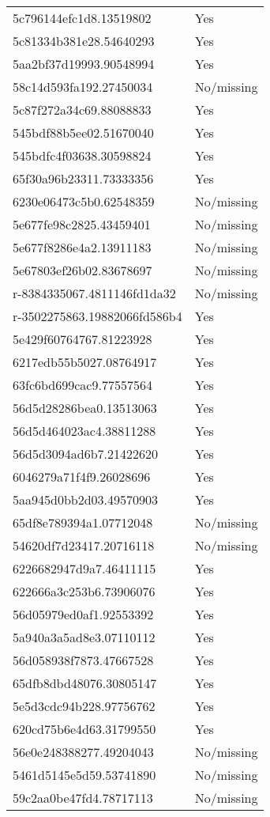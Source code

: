 \begin{tabular}{ll}
5c796144efc1d8.13519802 & Yes \\
5c81334b381e28.54640293 & Yes \\
5aa2bf37d19993.90548994 & Yes \\
58c14d593fa192.27450034 & No/missing \\
5c87f272a34c69.88088833 & Yes \\
545bdf88b5ee02.51670040 & Yes \\
545bdfc4f03638.30598824 & Yes \\
65f30a96b23311.73333356 & Yes \\
6230e06473c5b0.62548359 & No/missing \\
5e677fe98c2825.43459401 & No/missing \\
5e677f8286e4a2.13911183 & No/missing \\
5e67803ef26b02.83678697 & No/missing \\
r-8384335067.4811146fd1da32 & No/missing \\
r-3502275863.19882066fd586b4 & Yes \\
5e429f60764767.81223928 & Yes \\
6217edb55b5027.08764917 & Yes \\
63fc6bd699cac9.77557564 & Yes \\
56d5d28286bea0.13513063 & Yes \\
56d5d464023ac4.38811288 & Yes \\
56d5d3094ad6b7.21422620 & Yes \\
6046279a71f4f9.26028696 & Yes \\
5aa945d0bb2d03.49570903 & Yes \\
65df8e789394a1.07712048 & No/missing \\
54620df7d23417.20716118 & No/missing \\
6226682947d9a7.46411115 & Yes \\
622666a3c253b6.73906076 & Yes \\
56d05979ed0af1.92553392 & Yes \\
5a940a3a5ad8e3.07110112 & Yes \\
56d058938f7873.47667528 & Yes \\
65dfb8dbd48076.30805147 & Yes \\
5e5d3cdc94b228.97756762 & Yes \\
620cd75b6e4d63.31799550 & Yes \\
56e0e248388277.49204043 & No/missing \\
5461d5145e5d59.53741890 & No/missing \\
59c2aa0be47fd4.78717113 & No/missing \\

\end{tabular}
